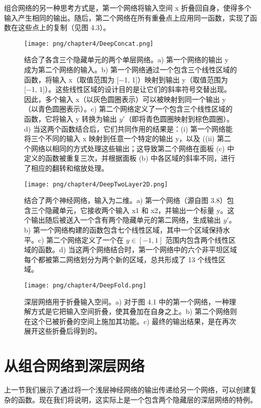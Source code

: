 组合网络的另一种思考方式是，第一个网络将输入空间 x 折叠回自身，使得多个输入产生相同的输出。随后，第二个网络在所有重叠点上应用同一函数，实现了函数在这些点上的复制（见图 4.3）。

\begin{figure}[ht!]
	\centering
	\texttt{[image: png/chapter4/DeepConcat.png]}
	\caption{结合了各含三个隐藏单元的两个单层网络。a) 第一个网络的输出 y 成为第二个网络的输入。b) 第一个网络通过一个包含三个线性区域的函数，将输入 x（取值范围为 [−1, 1]）映射到输出 y（取值范围为 [−1, 1]）。这些线性区域的设计目的是让它们的斜率符号交替出现。因此，多个输入 x（以灰色圆圈表示）可以被映射到同一个输出 y（以青色圆圈表示）。c) 第二个网络定义了一个包含三个线性区域的函数，它将输入 y 转换为输出 \(y \prime\)（即将青色圆圈映射到棕色圆圈）。d) 当这两个函数结合后，它们共同作用的结果是：(i) 第一个网络能将三个不同的输入 x 映射到任意一个特定的输出 y，以及 ((ii) 第二个网络以相同的方式处理这些输出；这导致第二个网络在面板 (c) 中定义的函数被重复三次，并根据面板 (b) 中各区域的斜率不同，进行了相应的翻转和缩放处理。}
\end{figure}

\begin{figure}[ht!]
	\centering
	\texttt{[image: png/chapter4/DeepTwoLayer2D.png]}
	\caption{结合了两个神经网络，输入为二维。a) 第一个网络（源自图 3.8）包含三个隐藏单元，它接收两个输入 x1 和 x2，并输出一个标量 y。这个输出随后被送入一个含有两个隐藏单元的第二网络，生成输出 \(y \prime\)。b) 第一个网络构建的函数包含七个线性区域，其中一个区域保持水平。c) 第二个网络定义了一个在 \(y \in [−1, 1]\) 范围内包含两个线性区域的函数。d) 当这两个网络结合时，第一个网络中的六个非平坦区域每个都被第二网络划分为两个新的区域，总共形成了 13 个线性区域。}
\end{figure}

\begin{figure}[ht!]
	\centering
	\texttt{[image: png/chapter4/DeepFold.png]}
	\caption{深层网络用于折叠输入空间。a) 对于图 4.1 中的第一个网络，一种理解方式是它把输入空间折叠，使其叠加在自身之上。b) 第二个网络则在这个已被折叠的空间上施加其功能。c) 最终的输出结果，是在再次展开这些折叠后得到的。}
\end{figure}

\section{从组合网络到深层网络}
上一节我们展示了通过将一个浅层神经网络的输出传递给另一个网络，可以创建复杂的函数。现在我们将说明，这实际上是一个包含两个隐藏层的深层网络的特例。

